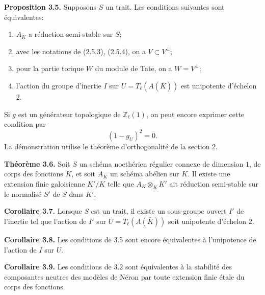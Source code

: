 \documentclass[11pt]{article}
\providecommand{\Z}{\mathbb Z}
\begin{document}
\textbf{Proposition 3.5.} Supposons \(S\) un trait.  Les conditions suivantes sont équivalentes:
\begin{enumerate}[label=(\roman*)]
\item \(A_K\) a réduction semi-stable sur \(S\);
\item avec les notations de (2.5.3), (2.5.4), on a \(V\subset V^\perp\);
\item pour la partie torique \(W\) du module de Tate, on a \(W=V^\perp\);
\item l'action du groupe d'inertie \(I\) sur \(U=T_\ell(A(\bar K))\) est unipotente d'échelon \(2\).
\end{enumerate}
Si \(g\) est un générateur topologique de \(\Z_\ell(1)\), on peut encore exprimer cette condition par
\begin{equation}\tag{3.5.3}
        (1-g_U)^2=0.
\end{equation}
La démonstration utilise le théorème d'orthogonalité de la section 2.

\textbf{Théorème 3.6.} Soit \(S\) un schéma noethérien régulier connexe de dimension \(1\), de corps des fonctions \(K\), et soit \(A_K\) un schéma abélien sur \(K\).  Il existe une extension finie galoisienne \(K'/K\) telle que \(A_K\otimes_KK'\) ait réduction semi-stable sur le normalisé \(S'\) de \(S\) dans \(K'\).

\textbf{Corollaire 3.7.} Lorsque \(S\) est un trait, il existe un sous-groupe ouvert \(I'\) de l'inertie tel que l'action de \(I'\) sur \(U=T_\ell(A(\bar K))\) soit unipotente d'échelon \(2\).

\textbf{Corollaire 3.8.} Les conditions de 3.5 sont encore équivalentes à l'unipotence de l'action de \(I\) sur \(U\).

\textbf{Corollaire 3.9.} Les conditions de 3.2 sont équivalentes à la stabilité des composantes neutres des modèles de Néron par toute extension finie étale du corps des fonctions.
\end{document}
